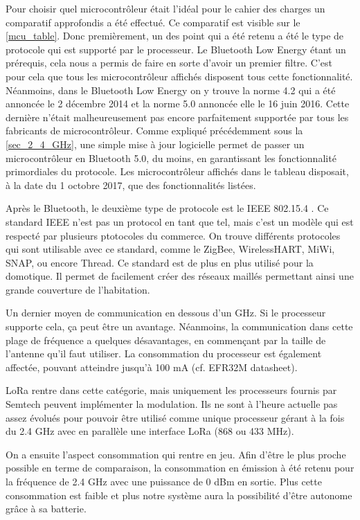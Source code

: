 Pour choisir quel microcontrôleur était l'idéal pour le cahier des charges un comparatif approfondis a été effectué. Ce comparatif est visible sur le \autoref{mcu_table}. Donc premièrement, un des point qui a été retenu a été le type de protocole qui est supporté par le processeur. Le Bluetooth Low Energy étant un prérequis, cela nous a permis de faire en sorte d'avoir un premier filtre. C'est pour cela que tous les microcontrôleur affichés disposent tous cette fonctionnalité. Néanmoins, dans le Bluetooth Low Energy on y trouve la norme 4.2 qui a été annoncée le 2 décembre 2014 \cite{Bluetoot59:online} et la norme 5.0 annoncée elle le 16 juin 2016. Cette dernière n'était malheureusement pas encore parfaitement supportée par tous les fabricants de microcontrôleur. Comme expliqué précédemment sous la \autoref{sec_2_4_GHz}, une simple mise à jour logicielle permet de passer un microcontrôleur en Bluetooth 5.0, du moins, en garantissant les fonctionnalité primordiales du protocole. Les microcontrôleur affichés dans le tableau disposait, à la date du 1 octobre 2017, que des fonctionnalités listées.

Après le Bluetooth, le deuxième type de protocole est le IEEE 802.15.4 \cite{IEEE802137:online}. Ce standard IEEE n'est pas un protocol en tant que tel, mais c'est un modèle qui est respecté par plusieurs ptotocoles du commerce. On trouve différents protocoles qui sont utilisable avec ce standard, comme le ZigBee, WirelessHART, MiWi, SNAP, ou encore Thread. Ce standard est de plus en plus utilisé pour la domotique. Il permet de facilement créer des réseaux maillés permettant ainsi une grande couverture de l'habitation.

Un dernier moyen de communication en dessous d'un GHz. Si le processeur supporte cela, ça peut être un avantage. Néanmoins, la communication dans cette plage de fréquence a quelques désavantages, en commençant par la taille de l'antenne qu'il faut utiliser. La consommation du processeur est également affectée, pouvant atteindre jusqu'à 100 mA (cf. EFR32M datasheet).

LoRa rentre dans cette catégorie, mais uniquement les processeurs fournis par Semtech peuvent implémenter la modulation. Ils ne sont à l'heure actuelle pas assez évolués pour pouvoir être utilisé comme unique processeur gérant à la fois du 2.4 GHz avec en parallèle une interface LoRa (868 ou 433 MHz).

On a ensuite l'aspect consommation qui rentre en jeu. Afin d'être le plus proche possible en terme de comparaison, la consommation en émission à été retenu pour la fréquence de 2.4 GHz avec une puissance de 0 dBm en sortie. Plus cette consommation est faible et plus notre système aura la possibilité d'être autonome grâce à sa batterie. 

